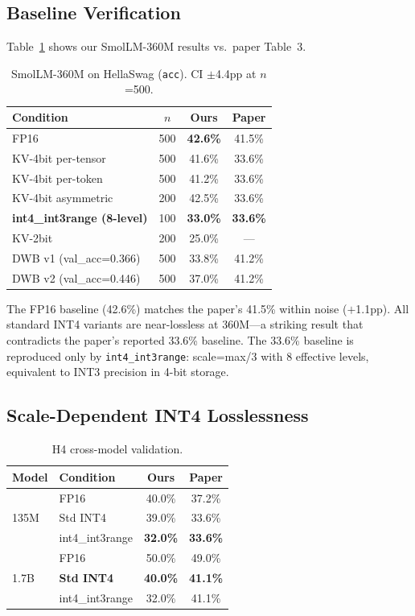 \documentclass[10pt,twocolumn]{article}
\begin{document}
\subsection{Baseline Verification}

Table~\ref{tab:main} shows our SmolLM-360M results vs.\ paper Table~3.

\begin{table}[h]
\centering
\caption{SmolLM-360M on HellaSwag (\texttt{acc}).
CI $\pm$4.4pp at $n$=500.}
\label{tab:main}
\footnotesize
\begin{tabular}{lccc}
\toprule
Condition & $n$ & Ours & Paper \\
\midrule
FP16 & 500 & \textbf{42.6\%} & 41.5\% \\
KV-4bit per-tensor & 500 & 41.6\% & 33.6\% \\
KV-4bit per-token & 500 & 41.2\% & 33.6\% \\
KV-4bit asymmetric & 200 & 42.5\% & 33.6\% \\
\textbf{int4\_int3range (8-level)} & 100 & \textbf{33.0\%} & \textbf{33.6\%} \\
KV-2bit & 200 & 25.0\% & --- \\
DWB v1 (val\_acc=0.366) & 500 & 33.8\% & 41.2\% \\
DWB v2 (val\_acc=0.446) & 500 & 37.0\% & 41.2\% \\
\bottomrule
\end{tabular}
\end{table}

The FP16 baseline (42.6\%) matches the paper's 41.5\% within noise ($+$1.1pp).
All standard INT4 variants are near-lossless at 360M—a striking result
that contradicts the paper's reported 33.6\% baseline.
The 33.6\% baseline is reproduced only by \texttt{int4\_int3range}:
scale=max/3 with 8 effective levels, equivalent to INT3 precision in
4-bit storage.

\subsection{Scale-Dependent INT4 Losslessness}

\begin{table}[h]
\centering
\caption{H4 cross-model validation.}
\label{tab:h4}
\footnotesize
\begin{tabular}{llcc}
\toprule
Model & Condition & Ours & Paper \\
\midrule
\multirow{3}{*}{135M} & FP16 & 40.0\% & 37.2\% \\
                       & Std INT4 & 39.0\% & 33.6\% \\
                       & int4\_int3range & \textbf{32.0\%} & \textbf{33.6\%} \\
\midrule
\multirow{3}{*}{1.7B} & FP16 & 50.0\% & 49.0\% \\
                       & \textbf{Std INT4} & \textbf{40.0\%} & \textbf{41.1\%} \\
                       & int4\_int3range & 32.0\% & 41.1\% \\
\bottomrule
\end{tabular}
\end{table}
\end{document}
